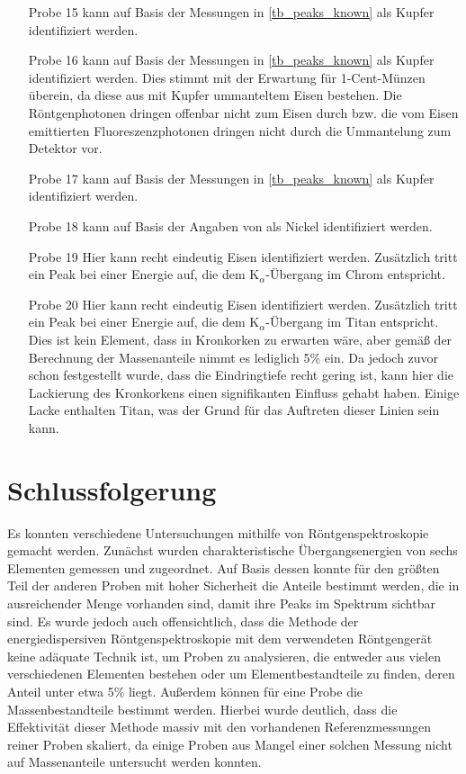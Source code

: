 \documentclass[
	a4paper,
	12pt,
	pagesize,
	ngerman
]{scrartcl}
\begin{document}
\begin{enumerate}
		\item[Probe 15] kann auf Basis der Messungen in \cref{tb_peaks_known} als Kupfer identifiziert werden.
		\item[Probe 16] kann auf Basis der Messungen in \cref{tb_peaks_known} als Kupfer identifiziert werden. Dies stimmt mit der Erwartung für 1-Cent-Münzen überein, da diese aus mit Kupfer ummanteltem Eisen bestehen. Die Röntgenphotonen dringen offenbar nicht zum Eisen durch bzw. die vom Eisen emittierten Fluoreszenzphotonen dringen nicht durch die Ummantelung zum Detektor vor.%
		\item[Probe 17] kann auf Basis der Messungen in \cref{tb_peaks_known} als Kupfer identifiziert werden.
		\item[Probe 18] kann auf Basis der Angaben von \cite{XRAYDB} als Nickel identifiziert werden.
		\item[Probe 19] Hier kann recht eindeutig Eisen identifiziert werden. Zusätzlich tritt ein Peak bei einer Energie auf, die dem $\text{K}_\alpha$-Übergang im Chrom entspricht.
		\item[Probe 20] Hier kann recht eindeutig Eisen identifiziert werden. Zusätzlich tritt ein Peak bei einer Energie auf, die dem $\text{K}_\alpha$-Übergang im Titan entspricht. Dies ist kein Element, dass in Kronkorken zu erwarten wäre, aber gemäß der Berechnung der Massenanteile nimmt es lediglich 5\% ein. Da jedoch zuvor schon festgestellt wurde, dass die Eindringtiefe recht gering ist, kann hier die Lackierung des Kronkorkens einen signifikanten Einfluss gehabt haben. Einige Lacke enthalten Titan, was der Grund für das Auftreten dieser Linien sein kann.
	\end{enumerate}

	\section{Schlussfolgerung}
	Es konnten verschiedene Untersuchungen mithilfe von Röntgenspektroskopie gemacht werden.
	Zunächst wurden charakteristische Übergangsenergien von sechs Elementen gemessen und zugeordnet.
	Auf Basis dessen konnte für den größten Teil der anderen Proben mit hoher Sicherheit die Anteile bestimmt werden, die in ausreichender Menge vorhanden sind, damit ihre Peaks im Spektrum sichtbar sind.
	Es wurde jedoch auch offensichtlich, dass die Methode der energiedispersiven Röntgenspektroskopie mit dem verwendeten Röntgengerät keine adäquate Technik ist, um Proben zu analysieren, die entweder aus vielen verschiedenen Elementen bestehen oder um Elementbestandteile zu finden, deren Anteil unter etwa 5\% liegt. %
	Außerdem können für eine Probe die Massenbestandteile bestimmt werden.
	Hierbei wurde deutlich, dass die Effektivität dieser Methode massiv mit den vorhandenen Referenzmessungen reiner Proben skaliert, da einige Proben aus Mangel einer solchen Messung nicht auf Massenanteile untersucht werden konnten.
\end{document}
